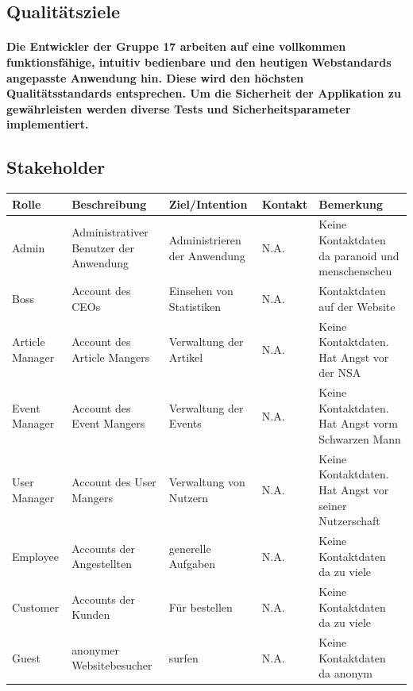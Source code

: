 \documentclass[a4paper]{article}
\begin{document}
\subsection{Qualitätsziele}

\paragraph{Die Entwickler der Gruppe 17 arbeiten auf eine vollkommen funktionsfähige, intuitiv bedienbare und den heutigen Webstandards angepasste Anwendung hin. Diese wird den höchsten Qualitätsstandards entsprechen. Um die Sicherheit der Applikation zu gewährleisten werden diverse Tests und Sicherheitsparameter implementiert.}

\subsection{Stakeholder}

\begin{longtable}{|l|p{75px}|p{75px}|l|p{75px}|}
	\hline
	\rowcolor[HTML]{C0C0C0}
	Rolle	& Beschreibung	& Ziel/Intention		& Kontakt	& Bemerkung	\\ \hline
	Admin	& Administrativer Benutzer der Anwendung	& Administrieren der Anwendung	& N.A.	&	Keine Kontaktdaten da paranoid und menschenscheu	\\ \hline
	Boss	& Account des CEOs	& Einsehen von Statistiken	& N.A.	& Kontaktdaten auf der Website	\\ \hline
	Article Manager	& Account des Article Mangers	& Verwaltung der Artikel	& N.A.	& Keine Kontaktdaten. Hat Angst vor der NSA	\\ \hline
	Event Manager	& Account des Event Mangers	& Verwaltung der Events	& N.A.	& Keine Kontaktdaten. Hat Angst vorm Schwarzen Mann	\\ \hline
	User Manager	& Account des User Mangers	& Verwaltung von Nutzern	& N.A.	& Keine Kontaktdaten. Hat Angst vor seiner Nutzerschaft	\\ \hline
	Employee	& Accounts der Angestellten	& generelle Aufgaben	& N.A.	& Keine Kontaktdaten da zu viele	\\ \hline
	Customer	& Accounts der Kunden	& Für bestellen	& N.A.	& Keine Kontaktdaten da zu viele	\\ \hline
	Guest	& anonymer Websitebesucher	& surfen	& N.A.	& Keine Kontaktdaten da anonym	\\ \hline
	
\end{longtable}
\end{document}
